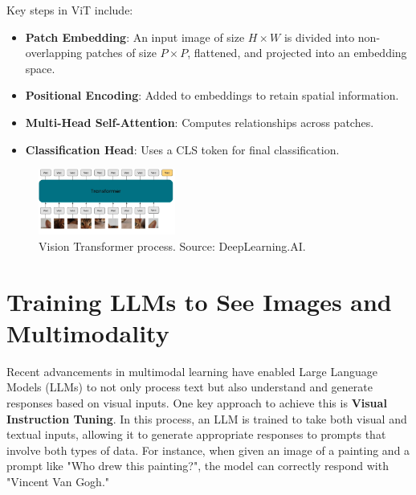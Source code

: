 Key steps in ViT include:

\begin{itemize}
    \item \textbf{Patch Embedding}: An input image of size \( H \times W \) is divided into non-overlapping patches of size \( P \times P \), flattened, and projected into an embedding space.
    \item \textbf{Positional Encoding}: Added to embeddings to retain spatial information.
    \item \textbf{Multi-Head Self-Attention}: Computes relationships across patches.
    \item \textbf{Classification Head}: Uses a CLS token for final classification.
\end{itemize}

\begin{figure}[h]
    \centering
    \includegraphics[width=0.4\textwidth]{IMAGES/immagine_2025-02-26_112630864.png}
    \caption{Vision Transformer process. Source: DeepLearning.AI.\footnotemark[4]}
    \label{fig:Vi Transformer }
\end{figure}

\section{Training LLMs to See Images and Multimodality}
Recent advancements in multimodal learning have enabled Large Language Models (LLMs) to not only process text but also understand and generate responses based on visual inputs. One key approach to achieve this is \textbf{Visual Instruction Tuning}. In this process, an LLM is trained to take both visual and textual inputs, allowing it to generate appropriate responses to prompts that involve both types of data. For instance, when given an image of a painting and a prompt like "Who drew this painting?", the model can correctly respond with "Vincent Van Gogh."

